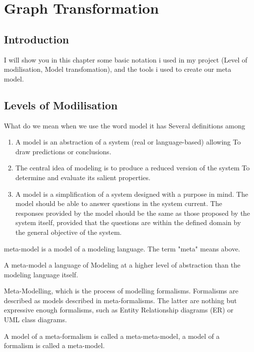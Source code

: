 
\chapter{\label{cha: Graph Transformation }Graph Transformation}

\section{ Introduction }
I will show you in this chapter some basic notation i used in my project (Level of modilisation, Model transfomation), and the tools i used to create our meta model.

\section{Levels of Modilisation}

What do we mean when we use the word model it has Several definitions among

\begin{enumerate}
\item A model is an abstraction of a system (real or language-based) allowing
To draw predictions or conclusions\cite{ch3-matters}. 
\item The central idea of modeling is to produce a reduced version of the system To determine and evaluate its salient properties\cite{ch3-selic}. 

\item A model is a simplification of a system designed with a purpose in mind.
The model should be able to answer questions in the system
current. The responses provided by the model should be the same as those proposed by the system itself, provided that the questions are within the defined domain by the general objective of the system\cite{ch3-def}.

\end{enumerate}

meta-model is a model of a modeling language. The term "meta" means above.

A meta-model  a language of Modeling at a higher level of abstraction than the modeling language itself\cite{ch3-applied}.


Meta-Modelling, which is the process of modelling formalisms. 
Formalisms are described as models described in meta-formalisms. 
The latter are nothing  but expressive enough formalisms, such as Entity Relationship diagrams (ER) or UML class diagrams.

A model of a meta-formalism is called a meta-meta-model, a model of a formalism is called a meta-model\cite{ch3-meta2}.

